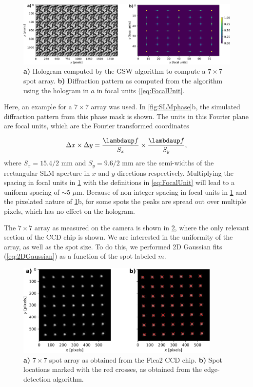 \begin{figure}
    \centering
    \includegraphics[width=\textwidth]{figures/MaskAndComputedPattern.pdf}
    \caption{\textbf{a)} Hologram computed by the \ac{GSW} algorithm to compute a $7\times7$ spot array.
    \textbf{b)} Diffraction pattern as computed from the algorithm using the hologram in $a$ in focal units (\cref{eq:FocalUnit}.}
    \label{fig:HologramPattern}
\end{figure}
Here, an example for a $7 \times 7$ array was used. 
In \cref{fig:SLMphase}b, the simulated diffraction pattern from this phase mask is shown. 
The units in this Fourier plane are focal units, which are the Fourier transformed coordinates \cite{Bijnen2015}

\begin{equation}\label{eq:FocalUnit}
    \Delta x \times \Delta y = \frac{\lambdaup f}{S_x}\times \frac{\lambdaup f}{S_y},
\end{equation}
where $S_x = 15.4/2$ mm and $S_y = 9.6/2$ mm are the semi-widths of the rectangular SLM aperture in $x$ and $y$ directions respectively.
Multiplying the spacing in focal units in \cref{fig:HologramPattern} with the definitions in \cref{eq:FocalUnit} will lead to a uniform spacing of $\sim 5$ $\mu$m. 
Because of non-integer spacing in focal units in \ref{fig:HologramPattern} and the pixelated nature of \ref{fig:HologramPattern}b, for some spots the peaks are spread out over multiple pixels, which has no effect on the hologram.

The $7\times7$ array as measured on the camera is shown in \cref{fig:CameraLoG}, where the only relevant section of the CCD chip is shown. 
We are interested in the uniformity of the array, as well as the spot size.
To do this, we performed 2D Gaussian fits (\cref{eq:2DGaussian}) as a function of the spot labeled $m$.

\begin{figure}
    \centering
    \includegraphics[width=0.9\textwidth]{figures/CamImgLoGSpots.pdf}
    \caption{\textbf{a)} $7\times7$ spot array as obtained from the Flea2 CCD chip.
    \textbf{b)} Spot locations marked with the red crosses, as obtained from the edge-detection algorithm. }
    \label{fig:CameraLoG}
\end{figure}

